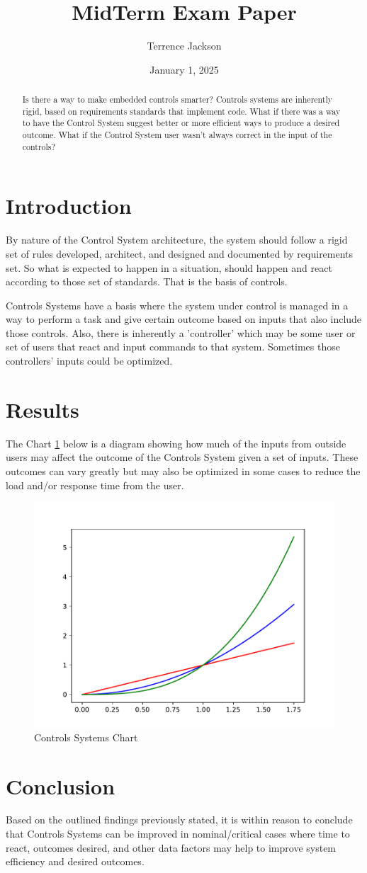 \documentclass{article}
\date{January 1, 2025}
\title{MidTerm Exam Paper}
\author{Terrence Jackson}
\begin{document}
\maketitle


\begin{abstract}
Is there a way to make embedded controls smarter? Controls systems are inherently rigid, based on requirements standards that implement code.  What if there was a way to have the Control System suggest better or more efficient ways to produce  a desired outcome.  What if the Control System user wasn't always correct in the input of the controls?
\end{abstract}

\section{Introduction}

By nature of the Control System architecture, the system should follow a rigid set of rules developed, architect,  and designed and documented by requirements set.  So what is expected to happen in a situation, should happen and react according to those set of standards. That is the basis of controls. 

Controls Systems have a basis where the system under control is managed in a way to perform a task and give certain outcome based on inputs that also include those controls.  Also, there is inherently a 'controller' which may be some user or set of users that react and input commands to that system.  Sometimes those controllers' inputs could be optimized.  

\section{Results}

The Chart \ref{fig:graph} below is a diagram showing how much of the inputs from outside users may affect the outcome of the Controls System given a set of inputs. These outcomes can vary greatly but may also be optimized in some cases to reduce the load and/or response time from the user. 

\begin{figure}[H]
\centering
\includegraphics[width=0.65\linewidth]{Midterm_Jackson.pdf}
\caption{\label{fig:graph} Controls Systems Chart}
\end{figure}
    

\section{Conclusion}

Based on the outlined findings previously stated, it is within reason to conclude that Controls Systems can be improved in nominal/critical cases where time to react, outcomes desired, and other data factors may help to improve system efficiency and desired outcomes. 
\end{document}
